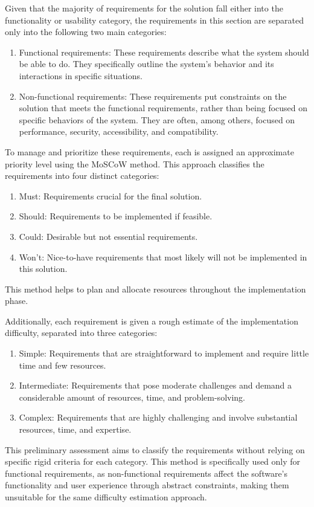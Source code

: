 Given that the majority of requirements for the solution fall either into the functionality or usability category, the requirements in this section are separated only into the following two main categories:~\cite{Aurum2005}
\begin{enumerate}
    \item Functional requirements: These requirements describe what the system should be able to do. They specifically outline the system's behavior and its interactions in specific situations.
    \item Non-functional requirements: These requirements put constraints on the solution that meets the functional requirements, rather than being focused on specific behaviors of the system. They are often, among others, focused on performance, security, accessibility, and compatibility.
\end{enumerate}

To manage and prioritize these requirements, each is assigned an approximate priority level using the MoSCoW method. This approach classifies the requirements into four distinct categories:~\cite{Stephens2023}
\begin{enumerate}
    \item Must: Requirements crucial for the final solution.
    \item Should: Requirements to be implemented if feasible.
    \item Could: Desirable but not essential requirements.
    \item Won't: Nice-to-have requirements that most likely will not be implemented in this solution.
\end{enumerate}
This method helps to plan and allocate resources throughout the implementation phase.

\break
Additionally, each requirement is given a rough estimate of the implementation difficulty, separated into three categories: \nopagebreak
\begin{enumerate}
    \item Simple: Requirements that are straightforward to implement and require little time and few resources.
    \item Intermediate: Requirements that pose moderate challenges and demand a considerable amount of resources, time, and problem-solving.
    \item Complex: Requirements that are highly challenging and involve substantial resources, time, and expertise.
\end{enumerate}
This preliminary assessment aims to classify the requirements without relying on specific rigid criteria for each category. This method is specifically used only for functional requirements, as non-functional requirements affect the software's functionality and user experience through abstract constraints, making them unsuitable for the same difficulty estimation approach.
